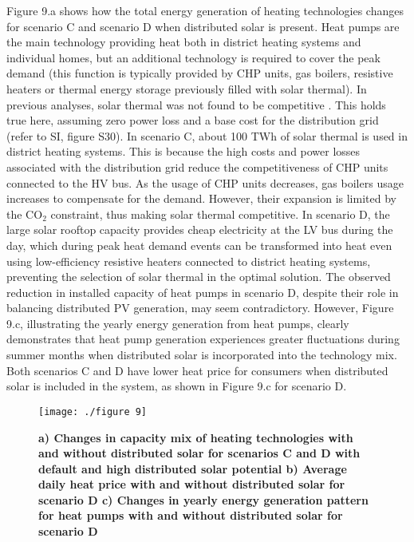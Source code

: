 \documentclass[review]{elsarticle}
\begin{document}
	Figure 9.a shows how the total energy generation of heating technologies changes for scenario C and scenario D when distributed solar is present. Heat pumps are the main technology providing heat both in district heating systems and individual homes, but an additional technology is required to cover the peak demand (this function is typically provided by CHP units, gas boilers, resistive heaters or thermal energy storage previously filled with solar thermal).  In previous analyses, solar thermal was not found to be competitive \cite{victoria_2022, zeyen2021mitigating}. This holds true here, assuming zero power loss and a base cost for the distribution grid (refer to SI, figure S30). 
	In scenario C, about 100 TWh of solar thermal is used in district heating systems. This is because the high costs and power losses associated with the distribution grid reduce the competitiveness of CHP units connected to the HV bus. As the usage of CHP units decreases, gas boilers usage increases to compensate for the demand. However, their expansion is limited by the $\mathrm{CO_2}$ constraint, thus making solar thermal competitive. 
	In scenario D, the large solar rooftop capacity provides cheap electricity at the LV bus during the day, which during peak heat demand events can be transformed into heat even using low-efficiency resistive heaters connected to district heating systems, preventing the selection of solar thermal in the optimal solution. The observed reduction in installed capacity of heat pumps in scenario D, despite their role in balancing distributed PV generation, may seem contradictory. However, Figure 9.c, illustrating the yearly energy generation from heat pumps, clearly demonstrates that heat pump generation experiences greater fluctuations during summer months when distributed solar is incorporated into the technology mix.
	Both scenarios C and D have lower heat price for consumers when distributed solar is included in the system, as shown in Figure 9.c for scenario D. 
	
	\begin{figure}
		\texttt{[image: ./figure 9]}
		\caption{\textbf{a) Changes in capacity mix of heating technologies with and without distributed solar for scenarios C and D with default and high distributed solar potential b) Average daily heat price with and without distributed solar for scenario D c) Changes in yearly energy generation pattern for heat pumps with and without distributed solar for scenario D }}
		\label{fig:heat}
	\end{figure}
	
\end{document}
